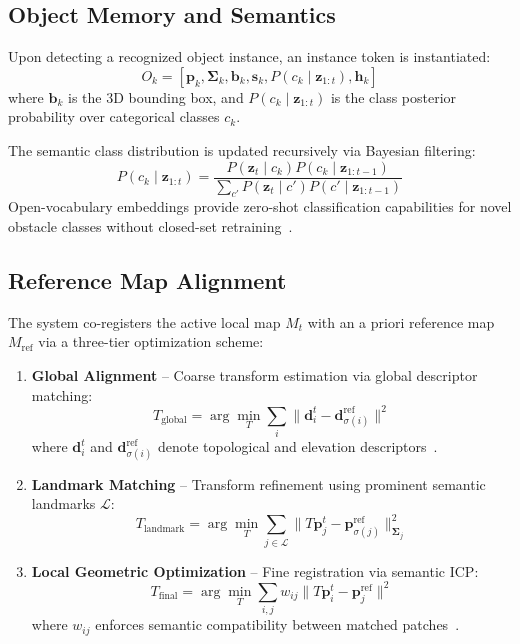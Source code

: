\subsection{Object Memory and Semantics}
\label{subsec:object_memory}

Upon detecting a recognized object instance, an instance token is instantiated:
\begin{equation}
  O_k = [\mathbf{p}_k, \mathbf{\Sigma}_k, \mathbf{b}_k, \mathbf{s}_k, P(c_k \mid \mathbf{z}_{1:t}), \mathbf{h}_k]
\end{equation}
where $\mathbf{b}_k$ is the 3D bounding box, and $P(c_k \mid \mathbf{z}_{1:t})$ is the class posterior probability over categorical classes $c_k$.

The semantic class distribution is updated recursively via Bayesian filtering:
\begin{equation}
  P(c_k \mid \mathbf{z}_{1:t}) = \frac{P(\mathbf{z}_t \mid c_k) P(c_k \mid \mathbf{z}_{1:t-1})}{\sum_{c'} P(\mathbf{z}_t \mid c') P(c' \mid \mathbf{z}_{1:t-1})}
\end{equation}
Open-vocabulary embeddings provide zero-shot classification capabilities for novel obstacle classes without closed-set retraining~\cite{li2024hislam, cai2024neusis, haghighi2024ovoslam}.

\subsection{Reference Map Alignment}
\label{subsec:refmap_alignment}

The system co-registers the active local map $M_t$ with an a priori reference map $M_{\text{ref}}$ via a three-tier optimization scheme:
\begin{enumerate}
  \item \textbf{Global Alignment} -- Coarse transform estimation via global descriptor matching:
  \begin{equation}
    T_{\text{global}} = \arg\min_T \sum_i \| \mathbf{d}_i^t - \mathbf{d}_{\sigma(i)}^{\text{ref}} \|^2
  \end{equation}
  where $\mathbf{d}_i^t$ and $\mathbf{d}_{\sigma(i)}^{\text{ref}}$ denote topological and elevation descriptors~\cite{liu2022largescale, yue2025airground, radwan2024uav}.
  \item \textbf{Landmark Matching} -- Transform refinement using prominent semantic landmarks $\mathcal{L}$:
  \begin{equation}
    T_{\text{landmark}} = \arg\min_T \sum_{j \in \mathcal{L}} \| T \mathbf{p}_j^t - \mathbf{p}_{\sigma(j)}^{\text{ref}} \|_{\mathbf{\Sigma}_j}^2
  \end{equation}
  \item \textbf{Local Geometric Optimization} -- Fine registration via semantic ICP:
  \begin{equation}
    T_{\text{final}} = \arg\min_T \sum_{i,j} w_{ij} \| T \mathbf{p}_i^t - \mathbf{p}_j^{\text{ref}} \|^2
  \end{equation}
  where $w_{ij}$ enforces semantic compatibility between matched patches~\cite{liu2022largescale, li2024hislam}.
\end{enumerate}


